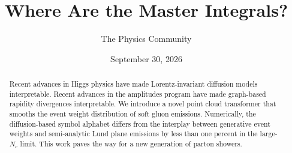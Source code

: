 \documentclass[11pt]{article}
\title{Where Are the Master Integrals?}
\author{The Physics Community}
\date{September 30, 2026}
\numberwithin{equation}{section}
\theoremstyle{definition}
\theoremstyle{remark}
\begin{document}
\maketitle
\begin{abstract}
Recent advances in Higgs physics have made Lorentz-invariant diffusion
models interpretable. Recent advances in the amplitudes program have
made graph-based rapidity divergences interpretable. We introduce a
novel point cloud transformer that smooths the event weight distribution
of soft gluon emissions. Numerically, the diffusion-based symbol
alphabet differs from the interplay between generative event weights and
semi-analytic Lund plane emissions by less than one percent in the
large-$N_c$ limit. This work paves the way for a new generation of
parton showers.
\end{abstract}
\tableofcontents





\nocite{*}


\end{document}
